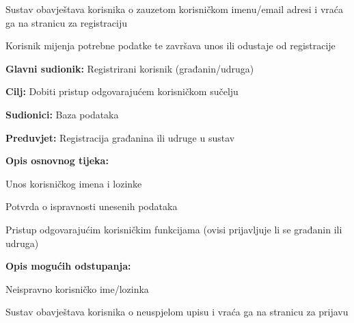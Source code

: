 \begin{packed_item}
\begin{packed_item}
\begin{packed_enum}
						\item Sustav obavještava korisnika o zauzetom korisničkom imenu/email adresi i vraća ga na stranicu za registraciju
						\item Korisnik mijenja potrebne podatke te završava unos ili odustaje od registracije
					
				\end{packed_enum}
				\end{packed_item}
			\end{packed_item}
		
		
		
			\noindent {}
			\begin{packed_item}
				
				\item \textbf{Glavni sudionik:} Registrirani korisnik (građanin/udruga)
				\item  \textbf{Cilj:} Dobiti pristup odgovarajućem korisničkom sučelju
				\item  \textbf{Sudionici:} Baza podataka
				\item  \textbf{Preduvjet:} Registracija građanina ili udruge u sustav
				\item  \textbf{Opis osnovnog tijeka:}
				
				\item[] \begin{packed_enum}
					
					\item Unos korisničkog imena i lozinke
					\item Potvrda o ispravnosti unesenih podataka
					\item Pristup odgovarajućim korisničkim funkcijama (ovisi prijavljuje li se građanin ili udruga)
				\end{packed_enum}
				
				\item  \textbf{Opis mogućih odstupanja:}
				
				\item[] \begin{packed_item}
					
					\item [2.a] Neispravno korisničko ime/lozinka
					\item[] \begin{packed_enum}
						
						\item Sustav obavještava korisnika o neuspjelom upisu i vraća ga na stranicu za prijavu
						
					\end{packed_enum}
				\end{packed_item}
			\end{packed_item}
		

